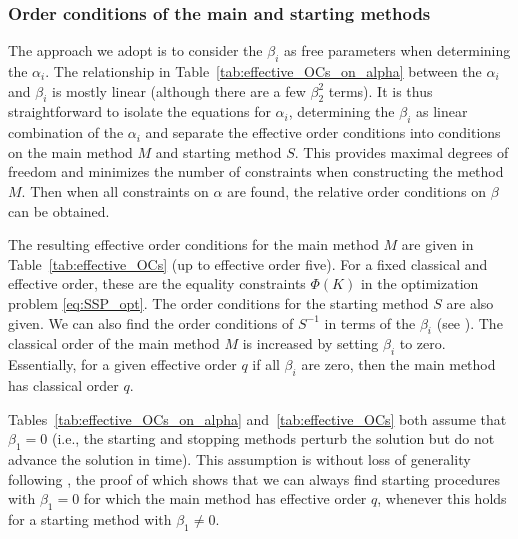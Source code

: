 \subsubsection{Order conditions of the main and starting methods}\label{subsubsec:Main_starting_conditions}
The approach we adopt is to consider the $\beta_{i}$ as free
parameters when determining the $\alpha_i$.
The relationship in Table~\ref{tab:effective_OCs_on_alpha} between the
$\alpha_i$ and $\beta_i$ is mostly linear (although there are a few
$\beta_2^2$ terms).
It is thus straightforward to isolate the equations for $\alpha_i$,
determining the $\beta_i$ as linear combination of the $\alpha_i$ and
separate the effective order conditions into conditions on the main method
$M$ and starting method $S$.
This provides maximal degrees of freedom and minimizes the number of
constraints when constructing the method $M$.
Then when all constraints on $\alpha$ are found, the relative order
conditions on $\beta$ can be obtained.

The resulting effective order conditions for the main method $M$ are given
in Table~\ref{tab:effective_OCs} (up to effective order five).
For a fixed classical and effective order, these are the equality constraints 
$\Phi(K)$ in the optimization problem \eqref{eq:SSP_opt}.
The order conditions for the starting method $S$ are also given.
We can also find the order conditions of $S^{-1}$ in terms of the
$\beta_i$ (see \cite[Table~386(III)]{Butcher2008_book}).
The classical order of the main method $M$ is increased by setting $\beta_i$
to zero. 
Essentially, for a given effective order $q$ if all $\beta_i$ are zero, then
the main method has classical order $q$.

Tables~\ref{tab:effective_OCs_on_alpha} and~\ref{tab:effective_OCs}
both assume that $\beta_1=0$ (i.e., the starting and stopping methods
perturb the solution but do not advance the solution in time).  This
assumption is without loss of generality following \cite[Lemma
389A]{Butcher2008_book}, the proof of which shows that we can always find 
starting procedures with $\beta_1 = 0$ for which the main method has 
effective order $q$, whenever this holds for a starting method with 
$\beta_1 \neq 0$.

